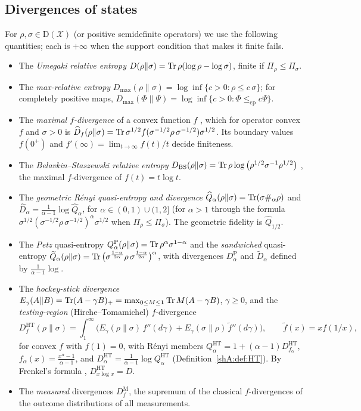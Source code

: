 \subsection*{Divergences of states}
For $\rho,\sigma\in\mathrm D(\mathcal X)$ (or positive semidefinite operators) we use the following quantities; each is $+\infty$ when the support condition that makes it finite fails.
\begin{itemize}
\item The \emph{Umegaki relative entropy} $D(\rho\|\sigma)=\operatorname{Tr}\rho(\log\rho-\log\sigma)$, finite if $\Pi_\rho\le\Pi_\sigma$.
\item The \emph{max-relative entropy} $D_{\max}(\rho\|\sigma)=\log\inf\{c>0:\rho\le c\,\sigma\}$; for completely positive maps, $D_{\max}(\Phi\|\Psi)=\log\inf\{c>0:\Phi\le_{\mathrm{cp}}c\Psi\}$.
\item The \emph{maximal $f$-divergence} of a convex function $f$ \cite{Matsumoto2018newf,HiaiMosonyi2017}, which for operator convex $f$ and $\sigma>0$ is $\widehat D_f(\rho\|\sigma)=\operatorname{Tr}\sigma^{1/2}f(\sigma^{-1/2}\rho\,\sigma^{-1/2})\sigma^{1/2}$. Its boundary values $f(0^+)$ and $f'(\infty)=\lim_{t\to\infty}f(t)/t$ decide finiteness.
\item The \emph{Belavkin--Staszewski relative entropy} $D_{\mathrm{BS}}(\rho\|\sigma)=\operatorname{Tr}\rho\log\big(\rho^{1/2}\sigma^{-1}\rho^{1/2}\big)$ \cite{BelavkinStaszewski1982}, the maximal $f$-divergence of $f(t)=t\log t$.
\item The \emph{geometric R\'enyi quasi-entropy and divergence} $\widehat Q_\alpha(\rho\|\sigma)=\operatorname{Tr}(\sigma\#_\alpha\rho)$ and $\widehat D_\alpha=\frac1{\alpha-1}\log\widehat Q_\alpha$, for $\alpha\in(0,1)\cup(1,2]$ (for $\alpha>1$ through the formula $\sigma^{1/2}(\sigma^{-1/2}\rho\,\sigma^{-1/2})^\alpha\sigma^{1/2}$ when $\Pi_\rho\le\Pi_\sigma$). The geometric fidelity is $\widehat Q_{1/2}$.
\item The \emph{Petz} quasi-entropy $Q^{\mathrm P}_\alpha(\rho\|\sigma)=\operatorname{Tr}\rho^\alpha\sigma^{1-\alpha}$ and the \emph{sandwiched} quasi-entropy $\widetilde Q_\alpha(\rho\|\sigma)=\operatorname{Tr}\big(\sigma^{\frac{1-\alpha}{2\alpha}}\rho\,\sigma^{\frac{1-\alpha}{2\alpha}}\big)^\alpha$, with divergences $D^{\mathrm P}_\alpha$ and $\widetilde D_\alpha$ defined by $\frac1{\alpha-1}\log$.
\item The \emph{hockey-stick divergence} $E_\gamma(A\|B)=\operatorname{Tr}(A-\gamma B)_+=\max_{0\le M\le\mathbf 1}\operatorname{Tr} M(A-\gamma B)$, $\gamma\ge0$, and the \emph{testing-region} (Hirche--Tomamichel) $f$-divergence \cite{HircheTomamichel2024}
\[
D^{\mathrm{HT}}_f(\rho\|\sigma)=\int_1^\infty\Big(E_\gamma(\rho\|\sigma)\,f''(d\gamma)+E_\gamma(\sigma\|\rho)\,\tilde f''(d\gamma)\Big),\qquad\tilde f(x)=xf(1/x),
\]
for convex $f$ with $f(1)=0$, with R\'enyi members $Q^{\mathrm{HT}}_\alpha=1+(\alpha-1)D^{\mathrm{HT}}_{f_\alpha}$, $f_\alpha(x)=\frac{x^\alpha-1}{\alpha-1}$, and $D^{\mathrm{HT}}_\alpha=\frac1{\alpha-1}\log Q^{\mathrm{HT}}_\alpha$ (Definition~\ref{shA:def:HT}). By Frenkel's formula \cite{Frenkel2023}, $D^{\mathrm{HT}}_{x\log x}=D$.
\item The \emph{measured} divergences $D^{\mathrm M}_f$, the supremum of the classical $f$-divergences of the outcome distributions of all measurements.
\end{itemize}
